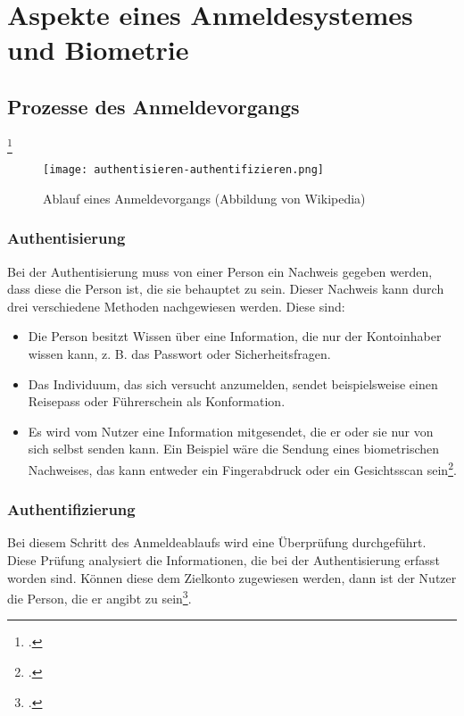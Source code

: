 \chapter{Aspekte eines Anmeldesystemes und Biometrie}
\strahlhofer

\section{Prozesse des Anmeldevorgangs}\footcite{authentifizierung}
\begin{center}
\begin{figure}[h]
    \centering
    \texttt{[image: authentisieren-authentifizieren.png]}
    \caption{Ablauf eines Anmeldevorgangs (Abbildung von Wikipedia)}
\end{figure}
\end{center}

\subsection{Authentisierung} 
Bei der Authentisierung muss von einer Person ein Nachweis gegeben werden, dass diese die Person ist, die sie behauptet zu sein. Dieser Nachweis kann durch drei verschiedene Methoden nachgewiesen werden. Diese sind:
\begin{itemize}
	\item Die Person besitzt Wissen über eine Information, die nur der Kontoinhaber wissen kann, z. B. das Passwort oder Sicherheitsfragen.
	\item Das Individuum, das sich versucht anzumelden, sendet beispielsweise einen Reisepass oder Führerschein als Konformation.
	\item Es wird vom Nutzer eine Information mitgesendet, die er oder sie nur von sich selbst senden kann. Ein Beispiel wäre die Sendung eines biometrischen Nachweises, das kann entweder ein Fingerabdruck oder ein Gesichtsscan sein\footcite{anmeldevorgangs}.
\end{itemize}


\subsection{Authentifizierung}
Bei diesem Schritt des Anmeldeablaufs wird eine Überprüfung durchgeführt. Diese Prüfung analysiert die Informationen, die bei der Authentisierung erfasst worden sind. Können diese dem Zielkonto zugewiesen werden, dann ist der Nutzer die Person, die er angibt zu sein\footcite{anmeldevorgangs}.



